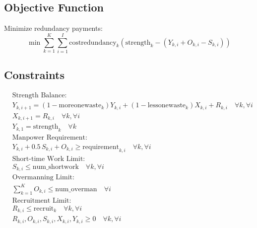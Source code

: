 \documentclass{article}
\begin{document}
\subsection*{Objective Function}

Minimize redundancy payments:
\[
\min \sum_{k=1}^{K} \sum_{i=1}^{I} \text{costredundancy}_k (\text{strength}_{k} - (Y_{k, i} + O_{k, i} - S_{k, i}))
\]

\subsection*{Constraints}

\begin{align}
& \text{Strength Balance:} \nonumber \\
& Y_{k, i+1} = (1 - \text{moreonewaste}_{k})Y_{k, i} + (1 - \text{lessonewaste}_{k})X_{k, i} + R_{k, i} \quad \forall k, \forall i \\
& X_{k, i+1} = R_{k, i} \quad \forall k, \forall i \\
& Y_{k, 1} = \text{strength}_{k} \quad \forall k \\
& \text{Manpower Requirement:} \nonumber \\
& Y_{k, i} + 0.5\,S_{k, i} + O_{k, i} \geq \text{requirement}_{k, i} \quad \forall k, \forall i \\
& \text{Short-time Work Limit:} \nonumber \\
& S_{k, i} \leq \text{num\_shortwork} \quad \forall k, \forall i \\
& \text{Overmanning Limit:} \nonumber \\
& \sum_{k=1}^{K} O_{k, i} \leq \text{num\_overman} \quad \forall i \\
& \text{Recruitment Limit:} \nonumber \\
& R_{k, i} \leq \text{recruit}_{k} \quad \forall k, \forall i \\
& R_{k, i}, O_{k, i}, S_{k, i}, X_{k, i}, Y_{k, i} \geq 0 \quad \forall k, \forall i
\end{align}
\end{document}
